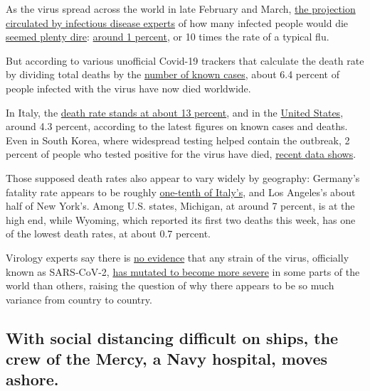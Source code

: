 As the virus spread across the world in late February and March,
\href{https://www.nytimes3xbfgragh.onion/2020/03/13/us/coronavirus-deaths-estimate.html}{the
projection circulated by infectious disease experts} of how many
infected people would die
\href{https://www.imperial.ac.uk/media/imperial-college/medicine/sph/ide/gida-fellowships/Imperial-College-COVID19-NPI-modelling-16-03-2020.pdf}{seemed
plenty dire}:
\href{https://www.c-span.org/video/?c4860450/user-clip-dr-anthony-fauci-addresses-covid-19-mortality-rate}{around
1 percent}, or 10 times the rate of a typical flu.

But according to various unofficial Covid-19 trackers that calculate the
death rate by dividing total deaths by the
\href{https://qap.ecdc.europa.eu/public/extensions/COVID-19/COVID-19.html}{number
of known cases}, about 6.4 percent of people infected with the virus
have now died worldwide.

In Italy, the
\href{https://www.nytimes3xbfgragh.onion/interactive/2020/world/europe/italy-coronavirus-cases.html}{death
rate stands at about 13 percent}, and in the
\href{https://www.nytimes3xbfgragh.onion/interactive/2020/us/coronavirus-us-cases.html}{United
States}, around 4.3 percent, according to the latest figures on known
cases and deaths. Even in South Korea, where widespread testing helped
contain the outbreak, 2 percent of people who tested positive for the
virus have died,
\href{https://www.nytimes3xbfgragh.onion/interactive/2020/world/coronavirus-maps.html\#countries}{recent
data shows}.

Those supposed death rates also appear to vary widely by geography:
Germany's fatality rate appears to be roughly
\href{https://www.nytimes3xbfgragh.onion/2020/04/04/world/europe/germany-coronavirus-death-rate.html}{one-tenth
of Italy's}, and Los Angeles's about half of New York's. Among U.S.
states, Michigan, at around 7 percent, is at the high end, while
Wyoming, which reported its first two deaths this week, has one of the
lowest death rates, at about 0.7 percent.

Virology experts say there is
\href{https://twitter.com/trvrb/status/1242628550563250176}{no evidence}
that any strain of the virus, officially known as SARS-CoV-2,
\href{https://nextstrain.org/help/coronavirus/FAQ\#is-one-strain-of-the-covid-19-virus-more-severe}{has
mutated to become more severe} in some parts of the world than others,
raising the question of why there appears to be so much variance from
country to country.

\hypertarget{with-social-distancing-difficult-on-ships-the-crew-of-the-mercy-a-navy-hospital-moves-ashore}{%
\subsection{With social distancing difficult on ships, the crew of the
Mercy, a Navy hospital, moves
ashore.}\label{with-social-distancing-difficult-on-ships-the-crew-of-the-mercy-a-navy-hospital-moves-ashore}}

